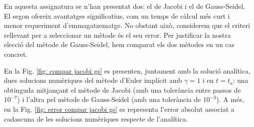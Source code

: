\documentclass[11pt]{article}
\begin{document}
En aquesta assignatura se n'han presentat dos: el de Jacobi i el de Gauss-Seidel. El segon ofereix avantatges significatius, com un temps de càlcul més curt i menor requeriment d'emmagatzematge. No obstant això, considerem que el criteri rellevant per a seleccionar un mètode és el seu error. Per justificar la nostra elecció del mètode de Gauss-Seidel, hem comparat els dos mètodes en un cas concret.

En la Fig. \ref{fig: compar jacobi gs} es presenten, juntament amb la solució analítica, dues solucions numèriques del mètode d'Euler implícit amb $\gamma=1$ i en $t=t_a$: una obtinguda mitjançant el mètode de Jacobi (amb una tolerància entre passos de $10^{-7}$) i l'altra pel mètode de Gauss-Seidel (amb una tolerància de $10^{-3}$). A més, en la Fig. \ref{fig: error compar jacobi gs} es representa l'error absolut associat a cadascuna de les solucions numèriques respecte de l'analítica.
\end{document}
